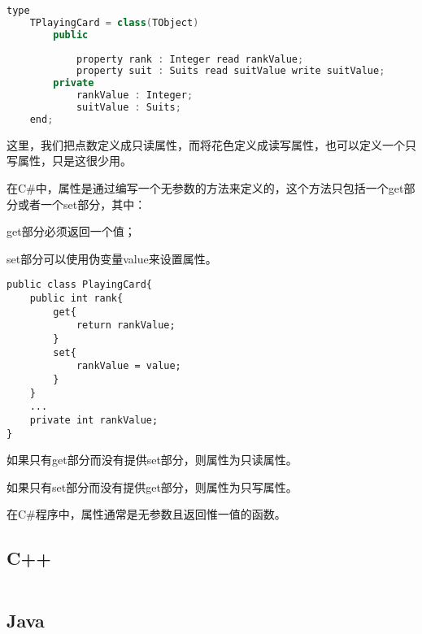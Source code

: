 \begin{lstlisting}[language=C++]
type
	TPlayingCard = class(TObject)
		public
				
			property rank : Integer read rankValue;
			property suit : Suits read suitValue write suitValue;
		private
			rankValue : Integer;
			suitValue : Suits;
	end;
\end{lstlisting}

这里，我们把点数定义成只读属性，而将花色定义成读写属性，也可以定义一个只写属性，只是这很少用。


在C\#中，属性是通过编写一个无参数的方法来定义的，这个方法只包括一个get部分或者一个set部分，其中：

\begin{compactitem}
\item get部分必须返回一个值；
\item set部分可以使用伪变量value来设置属性。
\end{compactitem}

\begin{lstlisting}[language={[Sharp]C}]
public class PlayingCard{
	public int rank{
		get{
			return rankValue;
		}
		set{
			rankValue = value;
		}
	}
	...
	private int rankValue;
}
\end{lstlisting}

\begin{compactitem}
\item 如果只有get部分而没有提供set部分，则属性为只读属性。
\item 如果只有set部分而没有提供get部分，则属性为只写属性。
\end{compactitem}

在C\#程序中，属性通常是无参数且返回惟一值的函数。

\subsection{C++}


\begin{lstlisting}[language=C++]

\end{lstlisting}




\subsection{Java}


\begin{lstlisting}[language=C++]

\end{lstlisting}



